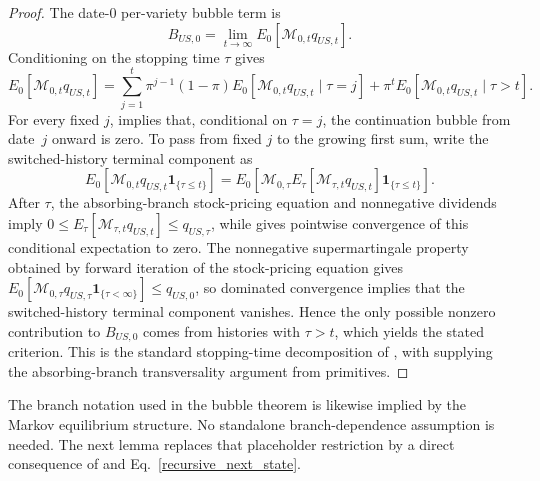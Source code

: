 \documentclass{article}
\begin{document}
\begin{proof}
The date-0 per-variety bubble term is
\[
B_{US,0}
=
\lim_{t\to\infty}E_0\!\left[\mathcal M_{0,t}q_{US,t}\right].
\]
Conditioning on the stopping time $\tau$ gives
\[
E_0\!\left[\mathcal M_{0,t}q_{US,t}\right]
=
\sum_{j=1}^{t}\pi^{j-1}(1-\pi)E_0\!\left[\mathcal M_{0,t}q_{US,t}\mid \tau=j\right]
+
\pi^t E_0\!\left[\mathcal M_{0,t}q_{US,t}\mid \tau>t\right].
\]
For every fixed $j$,  implies that, conditional on $\tau=j$, the continuation bubble from date~$j$ onward is zero. To pass from fixed $j$ to the growing first sum, write the switched-history terminal component as
\[
E_0\!\left[\mathcal M_{0,t}q_{US,t}\mathbf 1_{\{\tau\le t\}}\right]
=
E_0\!\left[\mathcal M_{0,\tau}
E_\tau\!\left[\mathcal M_{\tau,t}q_{US,t}\right]
\mathbf 1_{\{\tau\le t\}}\right].
\]
After $\tau$, the absorbing-branch stock-pricing equation and nonnegative dividends imply
$0\le E_\tau[\mathcal M_{\tau,t}q_{US,t}]\le q_{US,\tau}$, while  gives pointwise convergence of this conditional expectation to zero. The nonnegative supermartingale property obtained by forward iteration of the stock-pricing equation gives
$E_0[\mathcal M_{0,\tau}q_{US,\tau}\mathbf 1_{\{\tau<\infty\}}]\le q_{US,0}$, so dominated convergence implies that the switched-history terminal component vanishes. Hence the only possible nonzero contribution to $B_{US,0}$ comes from histories with $\tau>t$, which yields the stated criterion. This is the standard stopping-time decomposition of \citet{hirano2025technological}, with  supplying the absorbing-branch transversality argument from primitives.
\end{proof}

The branch notation used in the bubble theorem is likewise implied by the Markov equilibrium structure. No standalone branch-dependence assumption is needed. The next lemma replaces that placeholder restriction by a direct consequence of  and Eq.~\eqref{recursive_next_state}.
\end{document}
